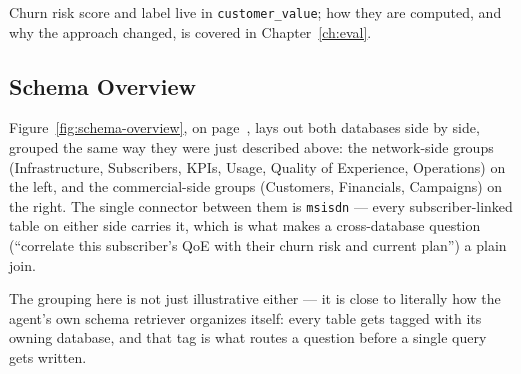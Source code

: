 Churn risk score and label live in \texttt{customer\_value}; how they are
computed, and why the approach changed, is covered in Chapter~\ref{ch:eval}.

\subsection{Schema Overview}

Figure~\ref{fig:schema-overview}, on page~\pageref{fig:schema-overview},
lays out both databases side by side, grouped the same way they were
just described above: the network-side groups (Infrastructure,
Subscribers, KPIs, Usage, Quality of Experience, Operations) on the
left, and the commercial-side groups (Customers, Financials, Campaigns)
on the right. The single connector between them is
\texttt{msisdn} — every subscriber-linked table on either side carries it,
which is what makes a cross-database question (``correlate this
subscriber's QoE with their churn risk and current plan'') a plain join.

The grouping here is not just illustrative either
--- it is close to literally how the agent's own schema retriever
organizes itself: every table gets tagged with its owning database, and
that tag is what routes a question before a single query gets written.

